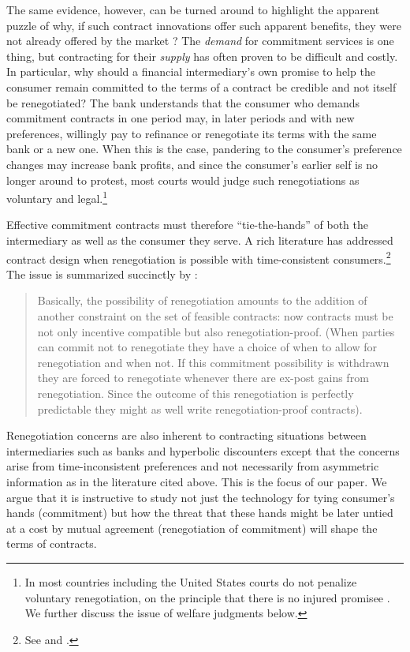 \documentclass[11pt,english]{article}
\theoremstyle{plain}
\theoremstyle{definition}
\begin{document}
The same evidence, however, can be turned around to highlight the apparent puzzle
of why, if such contract innovations offer such
apparent benefits, they were not already offered by the market \citep[on this, see also][]{laibson2015}?
The \textit{demand} for commitment services is one thing, but contracting
for their \textit{supply} has often proven to be difficult and costly. In
particular, why should a financial intermediary's own promise to help
the consumer remain committed to the terms of a contract be credible
and not itself be renegotiated? The bank understands that the consumer
who demands commitment contracts in one period may, in later periods
and with new preferences, willingly pay to refinance or renegotiate
its terms \textendash{} with the same bank or a new one. When this
is the case, pandering to the consumer's preference changes may increase
bank profits, and since the consumer's earlier self is no longer around to protest,  most courts would judge such renegotiations as voluntary and legal.\footnote{In most countries including the United States courts do not penalize
voluntary renegotiation, on the principle that there is no injured
promisee \citep[see discussion in][p448]{laibson1997}. We further discuss the issue of welfare judgments below.}

Effective commitment contracts must therefore ``tie-the-hands''
of both the intermediary as well as the consumer they serve. A rich
literature has addressed contract design when renegotiation is possible with time-consistent consumers.\footnote{See \citet{hart1988,dewatripont1989,bolton1990} and \citet{rubinstein1992}.}
The issue is  summarized succinctly by \citet[p303]{bolton1990}:
\begin{quote}
Basically, the possibility of renegotiation amounts to the addition
of another constraint on the set of feasible contracts: now contracts
must be not only incentive compatible but also renegotiation-proof.
(When parties can commit not to renegotiate they have a choice of
when to allow for renegotiation and when not. If this commitment possibility
is withdrawn they are forced to renegotiate whenever there are ex-post
gains from renegotiation. Since the outcome of this renegotiation
is perfectly predictable they might as well write renegotiation-proof
contracts).
\end{quote}
Renegotiation concerns are also inherent to contracting situations between
intermediaries such as banks and hyperbolic discounters except that the concerns
arise from time-inconsistent preferences
and not necessarily from asymmetric information as in the literature cited above. This is the focus of our paper.
We argue that it is instructive
to study not just the technology for tying consumer's hands (commitment)
but how the threat that these hands might be later untied at a cost by mutual agreement
(renegotiation of commitment) will shape the terms of contracts.
\end{document}
